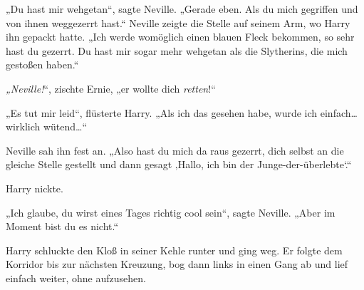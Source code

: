 „Du hast mir wehgetan“, sagte Neville. „Gerade eben. Als du mich gegriffen und von ihnen weggezerrt hast.“ Neville zeigte die Stelle auf seinem Arm, wo Harry ihn gepackt hatte. „Ich werde womöglich einen blauen Fleck bekommen, so sehr hast du gezerrt. Du hast mir sogar mehr wehgetan als die Slytherins, die mich gestoßen haben.“

\emph{„Neville!}“, zischte Ernie, „er wollte dich \emph{retten}!“

„Es tut mir leid“, flüsterte Harry. „Als ich das gesehen habe, wurde ich einfach…wirklich wütend…“

Neville sah ihn fest an. „Also hast du mich da raus gezerrt, dich selbst an die gleiche Stelle gestellt und dann gesagt ‚Hallo, ich bin der Junge-der-überlebte‘.“

Harry nickte.

„Ich glaube, du wirst eines Tages richtig cool sein“, sagte Neville. „Aber im Moment bist du es nicht.“

Harry schluckte den Kloß in seiner Kehle runter und ging weg. Er folgte dem Korridor bis zur nächsten Kreuzung, bog dann links in einen Gang ab und lief einfach weiter, ohne aufzusehen.

